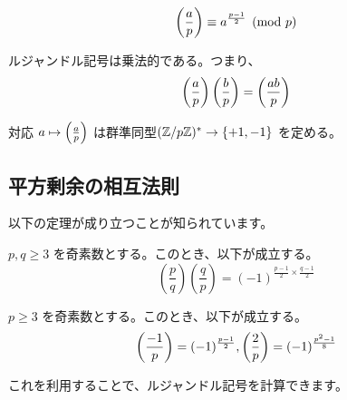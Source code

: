\documentclass{jsarticle}
\begin{document}
  \begin{proposition}
   \begin{displaymath}
     \left(\frac{a}{p}\right) \equiv a^{\frac{p-1}{2}} \pmod p
    \end{displaymath}
  \end{proposition}
  \begin{proposition}
   ルジャンドル記号は乗法的である。つまり、
   \begin{displaymath}
    \left(\frac{a}{p}\right) \left(\frac{b}{p}\right) = \left(\frac{ab}{p}\right)
   \end{displaymath}
  \end{proposition}
  \begin{corollary}
   対応 $a \mapsto \left(\frac{a}{p}\right)$ は群準同型$(\mathbb{Z}/p\mathbb{Z})^* \to \{+1,-1\}$ を定める。
  \end{corollary}
  \subsection{平方剰余の相互法則}
  以下の定理が成り立つことが知られています。
  \begin{theorem}[平方剰余の相互法則]
   $p, q \ge 3$ を奇素数とする。このとき、以下が成立する。
   \begin{displaymath}
    \left(\frac{p}{q}\right)\left(\frac{q}{p}\right) = (-1)^{\frac{p-1}{2} \times \frac{q-1}{2}}
   \end{displaymath}
  \end{theorem}
  \begin{theorem}[補充法則]
   $p \ge 3$ を奇素数とする。このとき、以下が成立する。
   \begin{displaymath}
    \left(\frac{-1}{p}\right) = (-1)^{\frac{p-1}{2}},
    \left(\frac{2}{p}\right) = (-1)^{\frac{p^2-1}{8}}
   \end{displaymath}
  \end{theorem}
  これを利用することで、ルジャンドル記号を計算できます。
\end{document}
